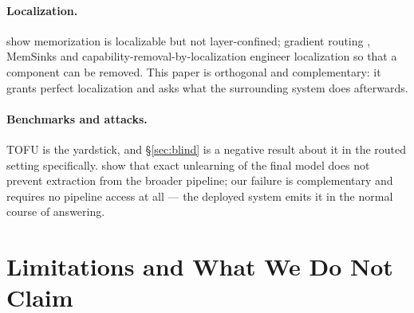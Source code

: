 \documentclass[11pt]{article}
\begin{document}
\paragraph{Localization.} \citet{maini2023localized} show memorization is localizable but not
layer-confined; gradient routing \citep{cloud2024gradrouting}, MemSinks
\citep{ghosal2025memsinks} and capability-removal-by-localization \citep{shilov2025beyond} engineer
localization so that a component can be removed. This paper is orthogonal and complementary: it
grants perfect localization and asks what the surrounding system does afterwards.

\paragraph{Benchmarks and attacks.} TOFU \citep{maini2024tofu} is the yardstick, and
\S\ref{sec:blind} is a negative result about it in the routed setting specifically. \citet{wu2025unlearned}
show that exact unlearning of the final model does not prevent extraction from the broader pipeline;
our failure is complementary and requires no pipeline access at all --- the deployed system emits it
in the normal course of answering.

\section{Limitations and What We Do Not Claim}
\label{sec:limits}
\end{document}

